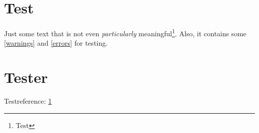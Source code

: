 \documentclass[a4paper,fleqn]{article}
\begin{document}
\tableofcontents

\section{Test}
\label{sec:test}
Just some text that is not even \emph{particularly} meaningful\footnote{Test}.
Also, it contains some \ref{warnings} and \ref{errors} for testing.



\section{Tester}
Testreference: \ref{sec:test}
\end{document}
